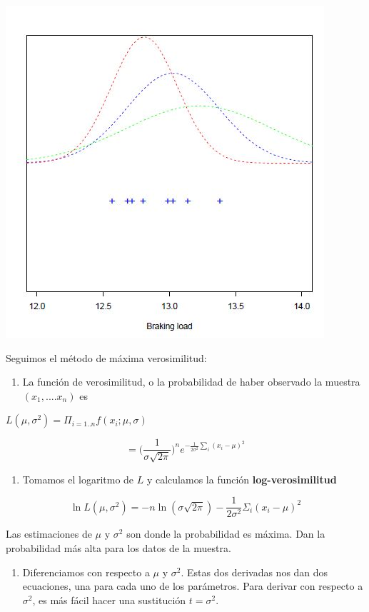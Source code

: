 \documentclass[
]{book}
\providecommand{\tightlist}{%
  \setlength{\itemsep}{0pt}\setlength{\parskip}{0pt}}
\begin{document}
\includegraphics{./figures/normpar.JPG}

Seguimos el método de máxima verosimilitud:

\begin{enumerate}
\def\labelenumi{\arabic{enumi}.}
\tightlist
\item
  La función de verosimilitud, o la probabilidad de haber observado la muestra \((x_1, ....x_n)\) es
\end{enumerate}

\(L(\mu, \sigma^2)=\Pi_{i=1..n} f(x_i;\mu,\sigma)\)

\[=\big( \frac{1}{\sigma \sqrt{2 \pi}}\big)^ne^{-\frac{1}{2\sigma^2} \sum_i(x_i-\mu) ^2}\]

\begin{enumerate}
\def\labelenumi{\arabic{enumi}.}
\setcounter{enumi}{1}
\tightlist
\item
  Tomamos el logaritmo de \(L\) y calculamos la función \textbf{log-verosimilitud}
\end{enumerate}

\[\ln L(\mu, \sigma^2)=-n \ln(\sigma \sqrt{2 \pi})-\frac{1}{2\sigma^2} \Sigma_i(x_i-\mu )^2\]

Las estimaciones de \(\mu\) y \(\sigma^2\) son donde la probabilidad es máxima. Dan la probabilidad más alta para los datos de la muestra.

\begin{enumerate}
\def\labelenumi{\arabic{enumi}.}
\setcounter{enumi}{2}
\tightlist
\item
  Diferenciamos con respecto a \(\mu\) y \(\sigma^2\). Estas dos derivadas nos dan dos ecuaciones, una para cada uno de los parámetros. Para derivar con respecto a \(\sigma^2\), es más fácil hacer una sustitución \(t=\sigma^2\).
\end{enumerate}
\end{document}
